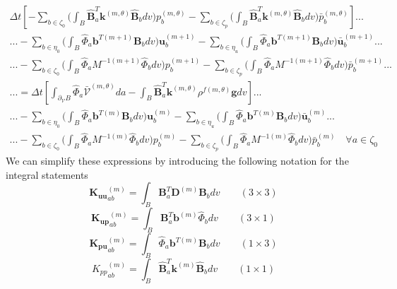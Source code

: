 \documentclass[11pt]{article} %
\begin{document}
\begin{eqnarray}
	\Delta t \left[ - \sum_{b \in \zeta_0} \bigg( \int_B \hat{\mathbf{B}}_a^T \mathbf{k}^{(m,\theta)} \hat{\mathbf{B}}_b dv \bigg) p_b^{(m,\theta)} - \sum_{b \in \zeta_p} \bigg(  \int_B \hat{\mathbf{B}}_a^T \mathbf{k}^{(m,\theta)} \hat{\mathbf{B}}_b dv \bigg) \bar{p}_b^{(m,\theta)} \right] ... \nonumber \\
	... - \sum_{b \in \eta_0} \bigg( \int_B \hat{\Phi}_a \mathbf{b}^{T (m+1)} \mathbf{B}_b dv \bigg) \mathbf{u}_b^{(m+1)} - \sum_{b \in \eta_u} \bigg( \int_B \hat{\Phi}_a \mathbf{b}^{T (m+1)} \mathbf{B}_b dv \bigg) \bar{\mathbf{u}}_b^{(m+1)} ... \nonumber \\
	... - \sum_{b \in \zeta_0} \bigg( \int_B \hat{\Phi}_a M^{-1 (m+1)} \hat{\Phi}_b dv \bigg) p_b^{(m+1)} - \sum_{b \in \zeta_p} \bigg(  \int_B \hat{\Phi}_a M^{-1 (m+1)} \hat{\Phi}_b dv \bigg) \bar{p}_b^{(m+1)} ... \nonumber \\
	... = \Delta t \left[ \int_{\partial_{\mathcal{V}} B} \hat{\Phi}_a \bar{\mathcal{V}}^{(m,\theta)} da - \int_B \hat{\mathbf{B}}_a^T \mathbf{k}^{(m,\theta)} \rho^{f (m,\theta)} \mathbf{g} dv \right] ... \nonumber \\
	... - \sum_{b \in \eta_0} \bigg( \int_B \hat{\Phi}_a \mathbf{b}^{T (m)} \mathbf{B}_b dv \bigg) \mathbf{u}_b^{(m)} - \sum_{b \in \eta_u} \bigg( \int_B \hat{\Phi}_a \mathbf{b}^{T (m)} \mathbf{B}_b dv \bigg) \bar{\mathbf{u}}_b^{(m)} ... \nonumber \\
	... - \sum_{b \in \zeta_0} \bigg( \int_B \hat{\Phi}_a M^{-1 (m)} \hat{\Phi}_b dv \bigg) p_b^{(m)} - \sum_{b \in \zeta_p} \bigg(  \int_B \hat{\Phi}_a M^{-1 (m)} \hat{\Phi}_b dv \bigg) \bar{p}_b^{(m)} \quad \forall a \in \zeta_0
\end{eqnarray}
We can simplify these expressions by introducing the following notation for the integral statements
\begin{equation}
	\mathbf{K_{uu}}_{ab}^{(m)} = \int_B \mathbf{B}_a^T \mathbf{D}^{(m)} \mathbf{B}_b dv \qquad ( 3 \times 3 )
	\label{eq:Kuu}
\end{equation}
\begin{equation}
	\mathbf{K_{up}}_{ab}^{(m)} = \int_B \mathbf{B}_a^T \mathbf{b}^{(m)} \hat{\Phi}_b dv \qquad ( 3 \times 1 )
\end{equation}
\begin{equation}
	\mathbf{K_{pu}}_{ab}^{(m)} = \int_B \hat{\Phi}_a \mathbf{b}^{T (m)} \mathbf{B}_b dv \qquad ( 1 \times 3 )
\end{equation}
\begin{equation}
	{K_{pp}}_{ab}^{(m)} = \int_B \hat{\mathbf{B}}_a^T \mathbf{k}^{(m)} \hat{\mathbf{B}}_b dv \qquad ( 1 \times 1 )
\end{equation}
\end{document}
